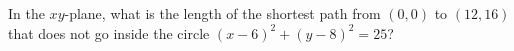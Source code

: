 In the $xy$-plane, what is the length of the shortest path from $(0,0)$ to $(12,16)$ that does not go inside the circle $(x-6)^2+(y-8)^2=25$?
